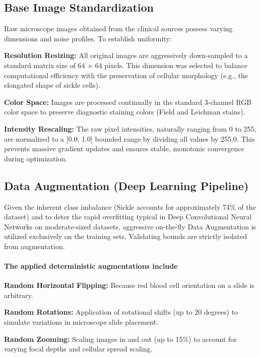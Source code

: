 \subsection{Base Image Standardization}

Raw microscope images obtained from the clinical sources possess varying dimensions and noise profiles. To establish uniformity:

\noindent\textbf{Resolution Resizing:} All original images are aggressively down-sampled to a standard matrix size of 64 $\times$ 64 pixels. This dimension was selected to balance computational efficiency with the preservation of cellular morphology (e.g., the elongated shape of sickle cells).

\noindent\textbf{Color Space:} Images are processed continually in the standard 3-channel RGB color space to preserve diagnostic staining colors (Field and Leichman stains).

\noindent\textbf{Intensity Rescaling:} The raw pixel intensities, naturally ranging from 0 to 255, are normalized to a [0.0, 1.0] bounded range by dividing all values by 255.0. This prevents massive gradient updates and ensures stable, monotonic convergence during optimization.

\subsection{Data Augmentation (Deep Learning Pipeline)}

Given the inherent class imbalance (Sickle accounts for approximately 74\% of the dataset) and to deter the rapid overfitting typical in Deep Convolutional Neural Networks on moderate-sized datasets, aggressive on-the-fly Data Augmentation is utilized exclusively on the training sets. Validating bounds are strictly isolated from augmentation.

\paragraph{The applied deterministic augmentations include}

\noindent\textbf{Random Horizontal Flipping:} Because red blood cell orientation on a slide is arbitrary.

\noindent\textbf{Random Rotations:} Application of rotational shifts (up to 20 degrees) to simulate variations in microscope slide placement.

\noindent\textbf{Random Zooming:} Scaling images in and out (up to 15\%) to account for varying focal depths and cellular spread scaling.

